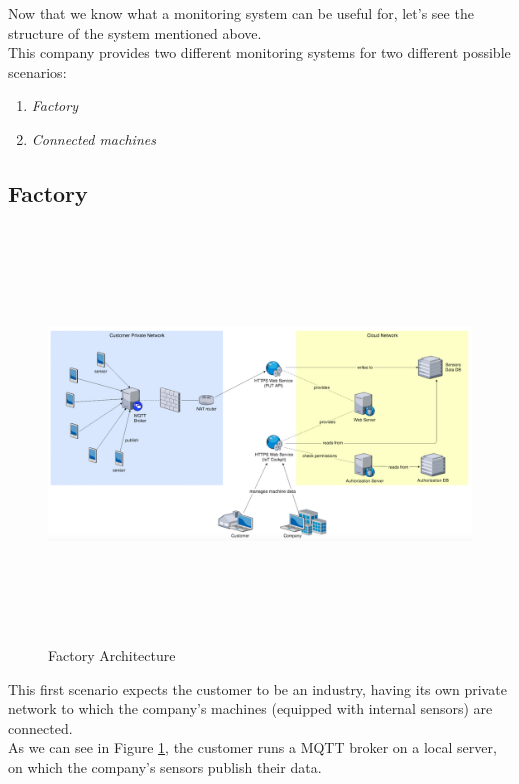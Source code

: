 \documentclass[12pt]{report}
\begin{document}
{{Now that we know what a monitoring system can be useful for, let's see the structure of the system mentioned above.\\

This company provides two different monitoring systems for two different possible scenarios:
\bigskip
\begin{enumerate}
\setlength{\itemindent}{+5mm}
\item \emph{Factory}
\item \emph{Connected machines}
\end{enumerate}

\clearpage
\subsection{Factory}

\begin{figure}[H]
\includegraphics[width=15cm,height=11cm,keepaspectratio]{factory_architecture}
\centering
\caption{Factory Architecture}
\label{fig:factoryarchitecture}
\end{figure}

This first scenario expects the customer to be an industry, having its own private network to which the company's machines (equipped with internal sensors) are connected.\\
As we can see in Figure \ref{fig:factoryarchitecture}, the customer runs a MQTT broker on a local server, on which the company's sensors publish their data.\\

}}
\end{document}
